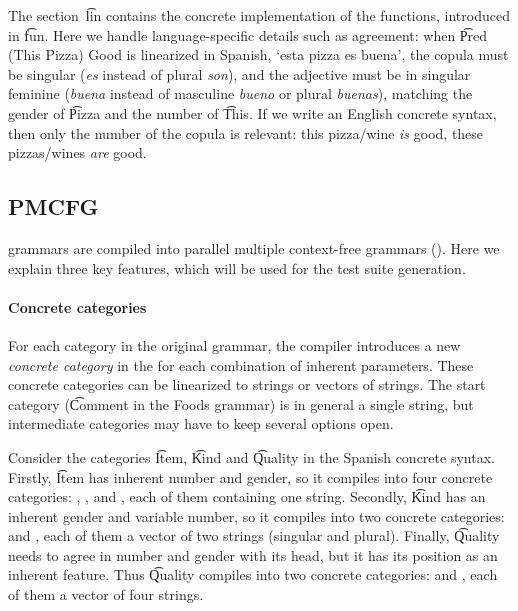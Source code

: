 The section~\t{lin} contains the concrete implementation of the
functions, introduced in \t{fun}. Here we handle
language-specific details such as agreement: when \t{Pred (This Pizza)
  Good} is linearized in Spanish, `esta pizza es buena', the copula must be singular
(\emph{es} instead of plural \emph{son}), and the adjective must be in singular
feminine (\emph{buena} instead of masculine \emph{bueno} or plural
\emph{buenas}), matching the gender of \t{Pizza} and the number of \t{This}. 
If we write an English concrete syntax, then only the number of the copula is
relevant: this pizza/wine \emph{is} good, these pizzas/wines \emph{are} good.


\subsection{PMCFG}
\label{sec:PMCFG}

\gf{} grammars are compiled into parallel multiple context-free
grammars (\pmcfg). Here we explain three key features, which will be
used for the test suite generation.

\paragraph{Concrete categories}

For each category in the original grammar, the \gf{} compiler
introduces a new \emph{concrete category} in the \pmcfg{} for each combination of
inherent parameters.  
These concrete categories can be linearized to strings or vectors of
strings. The start category (\t{Comment} in the Foods grammar) is in
general a single string, but intermediate categories may have to keep
several options open. 

Consider the categories \t{Item}, \t{Kind} and \t{Quality} in the
Spanish concrete syntax. Firstly, \t{Item} has inherent number
and gender, so it compiles into four concrete categories:
, ,  and
, each of them containing one string. Secondly,
\t{Kind} has an inherent gender and variable number, so it compiles into
two concrete categories:  and , each of them a
vector of two strings (singular and plural). Finally, \t{Quality} needs to
agree in number and gender with its head, but it has its position as
an inherent feature.  Thus \t{Quality} compiles into two concrete
categories:  and , each of them a vector of
four strings.

